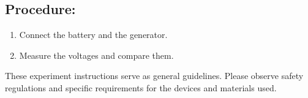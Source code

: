 \documentclass{scrreprt}
\begin{document}
\subsection*{Procedure:}
\begin{enumerate}
    \item Connect the battery and the generator.
    \item Measure the voltages and compare them.
\end{enumerate}

These experiment instructions serve as general guidelines. Please observe safety regulations and specific requirements for the devices and materials used.









\printglossaries
\end{document}
